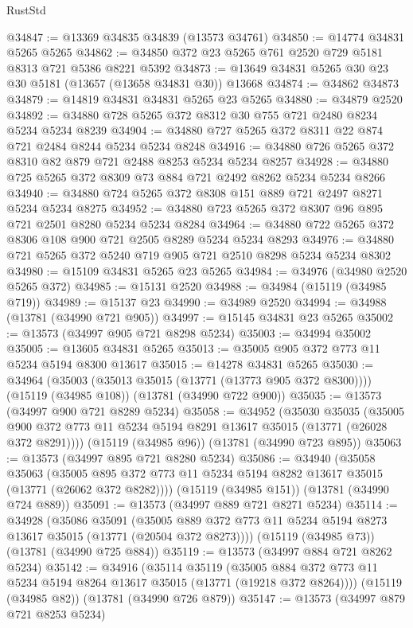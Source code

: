 \begin{lexlean}{RustStd}
\begin{coremodule}
@34847 := @13369 @34835 @34839 (@13573 @34761)
@34850 := @14774 @34831 @5265 @5265
@34862 := @34850 @372 @23 @5265 @761 @2520 @729 @5181 @8313 @721 @5386 @8221 @5392
@34873 := @13649 @34831 @5265 @30 @23 @30 @5181 (@13657 (@13658 @34831 @30)) @13668
@34874 := @34862 @34873
@34879 := @14819 @34831 @34831 @5265 @23 @5265
@34880 := @34879 @2520
@34892 := @34880 @728 @5265 @372 @8312 @30 @755 @721 @2480 @8234 @5234 @5234 @8239
@34904 := @34880 @727 @5265 @372 @8311 @22 @874 @721 @2484 @8244 @5234 @5234 @8248
@34916 := @34880 @726 @5265 @372 @8310 @82 @879 @721 @2488 @8253 @5234 @5234 @8257
@34928 := @34880 @725 @5265 @372 @8309 @73 @884 @721 @2492 @8262 @5234 @5234 @8266
@34940 := @34880 @724 @5265 @372 @8308 @151 @889 @721 @2497 @8271 @5234 @5234 @8275
@34952 := @34880 @723 @5265 @372 @8307 @96 @895 @721 @2501 @8280 @5234 @5234 @8284
@34964 := @34880 @722 @5265 @372 @8306 @108 @900 @721 @2505 @8289 @5234 @5234 @8293
@34976 := @34880 @721 @5265 @372 @5240 @719 @905 @721 @2510 @8298 @5234 @5234 @8302
@34980 := @15109 @34831 @5265 @23 @5265
@34984 := @34976 (@34980 @2520 @5265 @372)
@34985 := @15131 @2520
@34988 := @34984 (@15119 (@34985 @719))
@34989 := @15137 @23
@34990 := @34989 @2520
@34994 := @34988 (@13781 (@34990 @721 @905))
@34997 := @15145 @34831 @23 @5265
@35002 := @13573 (@34997 @905 @721 @8298 @5234)
@35003 := @34994 @35002
@35005 := @13605 @34831 @5265
@35013 := @35005 @905 @372 @773 @11 @5234 @5194 @8300 @13617
@35015 := @14278 @34831 @5265
@35030 := @34964
    (@35003 (@35013 @35015 (@13771 (@13773 @905 @372 @8300))))
    (@15119 (@34985 @108))
    (@13781 (@34990 @722 @900))
@35035 := @13573 (@34997 @900 @721 @8289 @5234)
@35058 := @34952
    (@35030
      @35035
      (@35005 @900 @372 @773 @11 @5234 @5194 @8291 @13617 @35015 (@13771 (@26028 @372 @8291))))
    (@15119 (@34985 @96))
    (@13781 (@34990 @723 @895))
@35063 := @13573 (@34997 @895 @721 @8280 @5234)
@35086 := @34940
    (@35058
      @35063
      (@35005 @895 @372 @773 @11 @5234 @5194 @8282 @13617 @35015 (@13771 (@26062 @372 @8282))))
    (@15119 (@34985 @151))
    (@13781 (@34990 @724 @889))
@35091 := @13573 (@34997 @889 @721 @8271 @5234)
@35114 := @34928
    (@35086
      @35091
      (@35005 @889 @372 @773 @11 @5234 @5194 @8273 @13617 @35015 (@13771 (@20504 @372 @8273))))
    (@15119 (@34985 @73))
    (@13781 (@34990 @725 @884))
@35119 := @13573 (@34997 @884 @721 @8262 @5234)
@35142 := @34916
    (@35114
      @35119
      (@35005 @884 @372 @773 @11 @5234 @5194 @8264 @13617 @35015 (@13771 (@19218 @372 @8264))))
    (@15119 (@34985 @82))
    (@13781 (@34990 @726 @879))
@35147 := @13573 (@34997 @879 @721 @8253 @5234)

\end{coremodule}
\end{lexlean}
